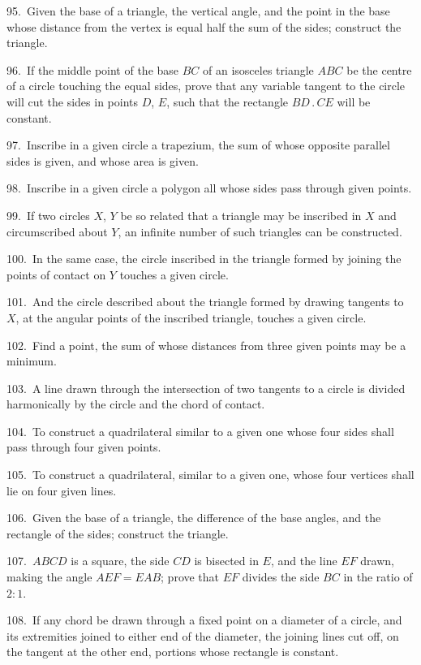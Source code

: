 \documentclass[oneside]{book}
\begin{document}
\begin{footnotesize}
95.~Given the base of a triangle, the vertical angle, and the
point in the base whose distance from the vertex is equal half
the sum of the sides; construct the triangle.

96.~If the middle point of the base $BC$ of an isosceles triangle
$ABC$ be the centre of a circle touching the equal sides, prove that
any variable tangent to the circle will cut the sides in points
$D$, $E$, such that the rectangle $BD\,.\,CE$ will be constant.

97.~Inscribe in a given circle a trapezium, the sum of whose
opposite parallel sides is given, and whose area is given.

98.~Inscribe in a given circle a polygon all whose sides pass
through given points.

99.~If two circles $X$, $Y$ be so related that a triangle may be
inscribed in $X$ and circumscribed about $Y$, an infinite number of
such triangles can be constructed.

100.~In the same case, the circle inscribed in the triangle
formed by joining the points of contact on $Y$ touches a given
circle.


101.~And the circle described about the triangle formed by
drawing tangents to $X$, at the angular points of the inscribed triangle,
touches a given circle.

102.~Find a point, the sum of whose distances from three
given points may be a minimum.

103.~A line drawn through the intersection of two tangents to
a circle is divided harmonically by the circle and the chord of
contact.

104.~To construct a quadrilateral similar to a given one whose
four sides shall pass through four given points.

105.~To construct a quadrilateral, similar to a given one,
whose four vertices shall lie on four given lines.

106.~Given the base of a triangle, the difference of the base
angles, and the rectangle of the sides; construct the triangle.

107.~$ABCD$ is a square, the side $CD$ is bisected in $E$, and the
line $EF$ drawn, making the angle $AEF = EAB$; prove that $EF$
divides the side $BC$ in the ratio of $2 : 1$.

108.~If any chord be drawn through a fixed point on a diameter
of a circle, and its extremities joined to either end of the
diameter, the joining lines cut off, on the tangent at the other
end, portions whose rectangle is constant.


\end{footnotesize}
\end{document}
